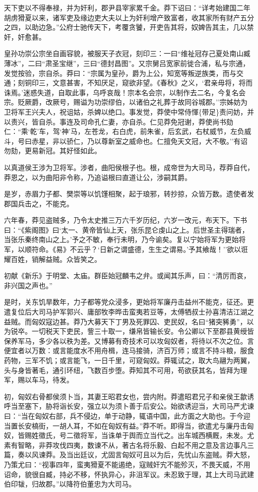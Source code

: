 \documentclass[]{article}
\begin{document}
天下吏以不得奉禄，并为奸利，郡尹县宰家累千金。莽下诏曰：``详考始建国二年胡虏猾夏以来，诸军吏及缘边吏大夫以上为奸利增产致富者，收其家所有财产五分之四，以助边急。''公府士驰传天下，考覆贪饕，开吏告其将，奴婢告其主，几以禁奸，奸愈甚。

皇孙功崇公宗坐自画容貌，被服天子衣冠，刻印三：一曰``维祉冠存己夏处南山臧薄冰''，二曰``肃圣宝继''，三曰``德封昌图''。又宗舅吕宽家前徙合浦，私与宗通，发觉按验，宗自杀。莽曰：``宗属为皇孙，爵为上公，知宽等叛逆族类，而与交通；刻铜印三，文意甚害，不知厌足，窥欲非望。《春秋》之义，`君亲毋将，将而诛焉。'迷惑失道，自取此事，乌呼哀哉！宗本名会宗，以制作去二名，今复名会宗。贬厥爵，改厥号，赐谥为功崇缪伯，以诸伯之礼葬于故同谷城郡。''宗姊妨为卫将军王兴夫人，祝诅姑，杀婢以绝口。事发觉，莽使中常侍惲\{带足\}责问妨，并以责兴，皆自杀。事连及司命孔仁妻，亦自杀。仁见莽免冠谢，莽使尚书劾仁：``乘`乾'车，驾`神'马，左苍龙，右白虎，前朱雀，后玄武，右杖威节，左负威斗，号曰赤星，非以骄仁，乃以尊新室之威命也。仁擅免天文冠，大不敬。''有诏勿劾，更易新冠。其好怪如此。

以真道侯王涉为卫将军。涉者，曲阳侯根子也。根，成帝世为大司马，荐莽自代，莽恩之，以为曲阳非令称，乃追谥根曰直道让公，涉嗣其爵。

是岁，赤眉力子都、樊崇等以饥馑相聚，起于琅邪，转抄掠，众皆万数。遗使者发郡国兵击之，不能克。

六年春，莽见盗贼多，乃令太史推三万六千岁历纪，六岁一改元，布天下。下书曰：``《紫阁图》曰`太一、黄帝皆仙上天，张乐昆仑虔山之上。后世圣主得瑞者，当张乐秦终南山之上。'予之不敏，奉行未明，乃今谕矣。复以宁始将军为更始将军，以顺符命。《易》不云乎？`日新之谓盛德，生生之谓易。'予其飨哉！''欲以诳耀百姓，销解益贼。众皆笑之。

初献《新乐》于明堂、太庙。群臣始冠麟韦之弁。或闻其乐声，曰：``清厉而哀，非兴国之声也。''

是时，关东饥旱数年，力子都等党众浸多，更始将军廉丹击益州不能克，征还。更遣复位后大司马护军郭兴、庸部牧李晔击蛮夷若豆等，太傅牺叔士孙喜清洁江湖之益贼。而匈奴寇边甚。莽乃大募天下丁男及死罪囚、吏民奴，名曰``猪突豨勇''，以为锐卒。一切税天下吏民，訾三十取一，缣帛皆输长安。令公卿以下至郡县黄绶皆保养军马，多少各以秩为差。又博募有奇技术可以攻匈奴者，将待以不次之位。言便宜者以万数：或言能度水不用舟楫，连马接骑，济百万师；或言不持斗粮，服食药物，三军不饥；或言能飞，一日千里，可窥匈奴。莽辄试之，取大鸟翮为两翼，头与身皆著毛，通引环纽，飞数百步堕。莽知其不可用，苟欲获其名，皆拜为理军，赐以车马，待发。

初，匈奴右骨都侯须卜当，其妻王昭君女也，尝内附。莽遣昭君兄子和亲侯王歙诱呼当至塞下，胁将诣长安，强立以为须卜善于后安公。始欲诱迎当，大司马严尤谏曰：``当在匈奴右部，兵不侵边，单于动静，辄语中国，此方面之大助也。于今迎当置长安槁街，一胡人耳，不如在匈奴有益。''莽不听。即得当，欲遣尤与廉丹击匈奴，皆赐姓徵氏，号二徵将军，当诛单于舆而立当代之。出车城西横厩，未发。尤素有智略，非莽攻伐四夷，数谏不从，著古名将乐毅、白起不用之意及言边事凡三篇，奏以风谏莽。及当出廷议，尤固言匈奴可且以为后，先忧山东盗贼。莽大怒，乃策尤曰：``视事四年，蛮夷猾夏不能遏绝，寇贼奸宄不能殄灭，不畏天威，不用诏命，貌很自臧，持必不移，怀执异心，非沮军议。未忍致于理，其上大司马武建伯印韨，归故郡。''以降符伯董忠为大司马。
\end{document}
